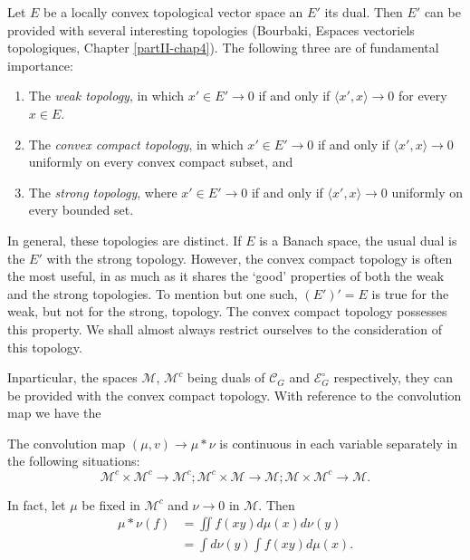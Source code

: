 Let $E$ be a locally convex topological vector space an $E'$ its
dual. Then $E'$ can be provided with several interesting topologies
(Bourbaki, Espaces vectoriels topologiques, Chapter
\ref{partII-chap4}). The following 
three are of fundamental importance: 
\begin{enumerate}
\renewcommand{\theenumi}{\roman{enumi}}
\renewcommand{\labelenumi}{(\theenumi)}
\item The \textit{weak topology}, in which $x' \in E' \rightarrow 0$
  if and only if $\langle x',x \rangle  \rightarrow 0$ for every
  $x\in E$. 

\item The \textit{convex compact topology}, in which $x' \in E'
  \rightarrow 0$ if and only if $\langle x',x \rangle \rightarrow 0$
  uniformly on every convex compact subset, and 

\item The \textit{strong topology}, where $x' \in E' \rightarrow 0 $
  if and only if $\langle x',x \rangle \rightarrow 0$ uniformly on
  every bounded set. 
\end{enumerate}

In general, these topologies are distinct. If $E$ is a Banach space,
the usual dual is the $E'$ with the strong topology. However, the convex
compact topology is often the most useful, in as much as it shares the
`good' properties of both the weak and the strong topologies. To
mention but one such, $(E')'=E$ is true for the weak, but not for the
strong, topology. The convex compact topology possesses this
property. We shall almost always restrict ourselves to the
consideration of this topology. 

In\pageoriginale particular, the spaces ${\mathscr{M}}$,
${\mathscr{M}}^c$ being duals of $\mathscr{C}_G$ 
and $\mathscr{E}^\circ_G$ respectively, they can be provided with the convex
compact topology. With reference to the convolution map we have the  

\setcounter{proposition}{0}
\begin{proposition}\label{partII-chap2-prop1}%
The convolution map $(\mu,v) \rightarrow \mu * \nu$ is continuous in
each variable separately in the following situations: 
$$
\mathscr{M}^c\times \mathscr{M}^c\rightarrow \mathscr{M}^c;
\mathscr{M}^c \times \mathscr{M} \rightarrow \mathscr{M};
\mathscr{M}\times \mathscr{M}^c 
\rightarrow \mathscr{M}. 
$$
\end{proposition}

In fact, let $\mu$ be fixed in $\mathscr{M}^c$ and $\nu \rightarrow 0$ in
$\mathscr{M}$. Then  
\begin{align*}
\mu * \nu (f) & = \iint f(xy) d \mu(x) d \nu(y)\\ 
& =\int d\nu(y) \int f(xy) d \mu(x).
\end{align*}

